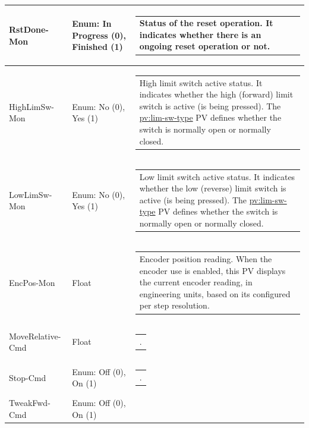 \documentclass[openany]{article}
\begin{document}
\begin{longtable}{| m{4.5cm} m{2.5cm}  m{8.5cm} |}
        RstDone-Mon & Enum: In Progress (0), Finished (1) & \begin{tabular}{@{}m{6cm}@{}}
                Status of the reset operation. It indicates whether there is an ongoing reset operation or not.
            \end{tabular} \hypertarget{pv:high-lim-sw-mon}{}\\ \hline
        HighLimSw-Mon & Enum: No (0), Yes (1) & \begin{tabular}{@{}m{6cm}@{}}
                High limit switch active status. It indicates whether the high (forward) limit switch is active (is being pressed). The \hyperlink{limit switch type}{pv:lim-sw-type} PV defines whether the switch is normally open or normally closed.
            \end{tabular} \hypertarget{pv:low-lim-sw-mon}{}\\ \hline
        LowLimSw-Mon & Enum: No (0), Yes (1) & \begin{tabular}{@{}m{6cm}@{}}
                Low limit switch active status. It indicates whether the low (reverse) limit switch is active (is being pressed). The \hyperlink{limit switch type}{pv:lim-sw-type} PV defines whether the switch is normally open or normally closed.
            \end{tabular} \hypertarget{pv:enc-pos-mon}{}\\ \hline
        EncPos-Mon & Float & \begin{tabular}{@{}m{6cm}@{}}
                Encoder position reading. When the encoder use is enabled, this PV displays the current encoder reading, in engineering units, based on its configured per step resolution.
            \end{tabular} \hypertarget{pv:move-relative-cmd}{}\\ \hline
        MoveRelative-Cmd & Float & \begin{tabular}{@{}m{6cm}@{}}
                .
            \end{tabular} \hypertarget{pv:stop-cmd}{}\\ \hline
        Stop-Cmd & Enum: Off (0), On (1) & \begin{tabular}{@{}m{6cm}@{}}
                .
            \end{tabular} \hypertarget{pv:tweak-fwd-cmd}{}\\ \hline
        TweakFwd-Cmd & Enum: Off (0), On (1) & \begin{tabular}{@{}m{6cm}@{}}

\end{tabular}
\end{longtable}
\end{document}
